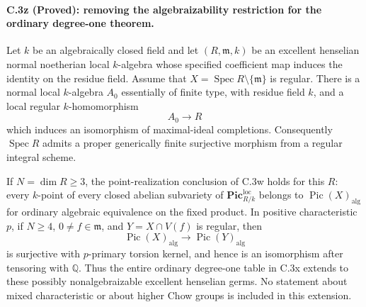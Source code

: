 \paragraph{C.3z (Proved): removing the algebraizability restriction for the ordinary degree-one theorem.}
Let $k$ be an algebraically closed field and let $(R,\mathfrak m,k)$
be an excellent henselian normal noetherian local $k$-algebra whose
specified coefficient map induces the identity on the residue field.
Assume that $X=\operatorname{Spec}R\setminus\{\mathfrak m\}$ is regular.
There is a normal local $k$-algebra $A_0$ essentially of finite type,
with residue field $k$, and a local regular $k$-homomorphism
\[
                    A_0\longrightarrow R
\]
which induces an isomorphism of maximal-ideal completions.
Consequently $\operatorname{Spec}R$ admits a proper generically finite
surjective morphism from a regular integral scheme.

If $N=\dim R\ge3$, the point-realization conclusion of C.3w holds
for this $R$: every $k$-point of every closed abelian subvariety
of $\mathbf{Pic}^{\mathrm{loc}}_{R/k}$ belongs to
$\operatorname{Pic}(X)_{\mathrm{alg}}$ for ordinary algebraic
equivalence on the fixed product.
In positive characteristic $p$, if $N\ge4$, $0\ne f\in\mathfrak m$,
and $Y=X\cap V(f)$ is regular, then
\[
 \operatorname{Pic}(X)_{\mathrm{alg}}
       \longrightarrow\operatorname{Pic}(Y)_{\mathrm{alg}}
\]
is surjective with $p$-primary torsion kernel, and hence is an
isomorphism after tensoring with $\mathbb Q$.
Thus the entire ordinary degree-one table in C.3x extends to
these possibly nonalgebraizable excellent henselian germs.
No statement about mixed characteristic or about higher Chow
groups is included in this extension.


